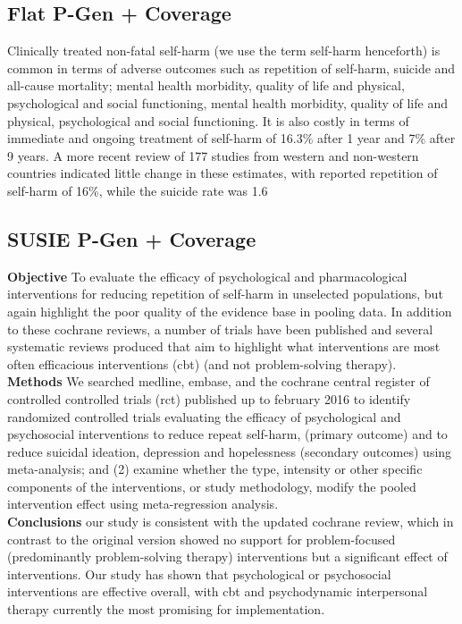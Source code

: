 \documentclass[runningheads]{llncs}
\begin{document}
\subsection{Flat P-Gen + Coverage}
Clinically treated non-fatal self-harm (we use the term self-harm henceforth) is common in terms of adverse outcomes such as repetition of self-harm, suicide and all-cause mortality; mental health morbidity, quality of life and physical, psychological and social functioning, mental health morbidity, quality of life and physical, psychological and social functioning. It is also costly in terms of immediate and ongoing treatment of self-harm of 16.3\% after 1 year and 7\% after 9 years. A more recent review of 177 studies from western and non-western countries indicated little change in these estimates, with reported repetition of self-harm of 16\%, while the suicide rate was 1.6

\subsection{SUSIE P-Gen + Coverage}
\textbf{Objective} To evaluate the efficacy of psychological and pharmacological interventions for reducing repetition of self-harm in unselected populations, but again highlight the poor quality of the evidence base in pooling data. In addition to these cochrane reviews, a number of trials have been published and several systematic reviews produced that aim to highlight what interventions are most often efficacious interventions (cbt) (and not problem-solving therapy). \\
\textbf{Methods} We searched medline, embase, and the cochrane central register of controlled controlled trials (rct) published up to february 2016 to identify randomized controlled trials evaluating the efficacy of psychological and psychosocial interventions to reduce repeat self-harm, (primary outcome) and to reduce suicidal ideation, depression and hopelessness (secondary outcomes) using meta-analysis; and (2) examine whether the type, intensity or other specific components of the interventions, or study methodology, modify the pooled intervention effect using meta-regression analysis. \\
\textbf{Conclusions} our study is consistent with the updated cochrane review, which in contrast to the original version showed no support for problem-focused (predominantly problem-solving therapy) interventions but a significant effect of interventions. Our study has shown that psychological or psychosocial interventions are effective overall, with cbt and psychodynamic interpersonal therapy currently the most promising for implementation.
\end{document}
